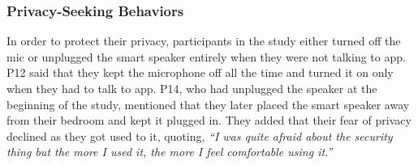     \subsubsection{ Privacy-Seeking Behaviors}
    In order to protect their privacy, participants in the study either turned off the mic or unplugged the smart speaker entirely when they were not talking to \acl{app}. 
    P12 said that they kept the microphone off all the time and turned it on only when they had to talk to \acl{app}. 
    P14, who had unplugged the speaker at the beginning of the study, mentioned that they later placed the smart speaker away from their bedroom and kept it plugged in. They added that their fear of privacy declined as they got used to it, quoting,  
    	    \textit{
        	``I was quite afraid about the security thing but the more I used it, the more I feel comfortable using it.''
            }

